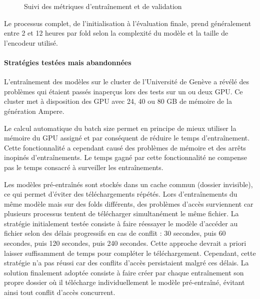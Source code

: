 \begin{figure}[H]
    \centering
    \caption{Suivi des métriques d'entraînement et de validation}
    \label{fig:ch36_entrainement_01_suivi_metriques}
\end{figure}

Le processus complet, de l'initialisation à l'évaluation finale, prend généralement entre 2 et 12 heures par fold selon la complexité du modèle et la taille de l'encodeur utilisé.

\paragraph{Stratégies testées mais abandonnées}
L'entraînement des modèles sur le cluster de l'Université de Genève a révélé des problèmes qui étaient passés inaperçus lors des tests sur un ou deux GPU. Ce cluster met à disposition des GPU avec 24, 40 ou 80 GB de mémoire de la génération Ampere.

Le calcul automatique du batch size permet en principe de mieux utiliser la mémoire du GPU assigné et par conséquent de réduire le temps d'entraînement. Cette fonctionnalité a cependant causé des problèmes de mémoire et des arrêts inopinés d'entraînements. Le temps gagné par cette fonctionnalité ne compense pas le temps consacré à surveiller les entraînements.

Les modèles pré-entraînés sont stockés dans un cache commun (dossier invisible), ce qui permet d'éviter des téléchargements répétés. Lors d'entraînements du même modèle mais sur des folds différents, des problèmes d'accès surviennent car plusieurs processus tentent de télécharger simultanément le même fichier. La stratégie initialement testée consiste à faire réessayer le modèle d'accéder au fichier selon des délais progressifs en cas de conflit : 30 secondes, puis 60 secondes, puis 120 secondes, puis 240 secondes. Cette approche devrait a priori laisser suffisamment de temps pour compléter le téléchargement. Cependant, cette stratégie n'a pas réussi car des conflits d'accès persistaient malgré ces délais. La solution finalement adoptée consiste à faire créer par chaque entraînement son propre dossier où il télécharge individuellement le modèle pré-entraîné, évitant ainsi tout conflit d'accès concurrent.

